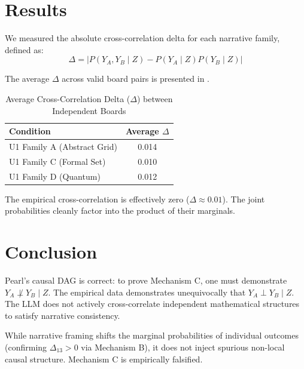 \documentclass[12pt,a4paper]{article}
\begin{document}
\section{Results}
We measured the absolute cross-correlation delta for each narrative family, defined as:
\begin{equation}
\Delta = \left| P(Y_A, Y_B \mid Z) - P(Y_A \mid Z) P(Y_B \mid Z) \right|
\end{equation}

The average $\Delta$ across valid board pairs is presented in .

\begin{table}[ht]
\centering
\caption{Average Cross-Correlation Delta ($\Delta$) between Independent Boards}
\label{tab:causal}
\begin{tabular}{lc}
\toprule
\textbf{Condition} & \textbf{Average $\Delta$} \\
\midrule
U1 Family A (Abstract Grid) & 0.014 \\
U1 Family C (Formal Set) & 0.010 \\
U1 Family D (Quantum) & 0.012 \\
\bottomrule
\end{tabular}
\end{table}

The empirical cross-correlation is effectively zero ($\Delta \approx 0.01$). The joint probabilities cleanly factor into the product of their marginals.

\section{Conclusion}
Pearl's causal DAG is correct: to prove Mechanism C, one must demonstrate $Y_A \not\perp Y_B \mid Z$. The empirical data demonstrates unequivocally that $Y_A \perp Y_B \mid Z$. The LLM does not actively cross-correlate independent mathematical structures to satisfy narrative consistency.

While narrative framing shifts the marginal probabilities of individual outcomes (confirming $\Delta_{13} > 0$ via Mechanism B), it does not inject spurious non-local causal structure. Mechanism C is empirically falsified.
\end{document}

